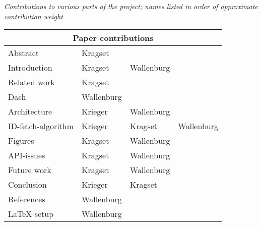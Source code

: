 \begin{appendix}
    \textit{Contributions to various parts of the project; names listed in order
        of approximate contribution weight}

    \resizebox{8cm}{!} {
        \begin{tabular}{| l | l | l | l |}
            \hline
            \multicolumn{4}{|c|}{Paper contributions} \\
            \hline
            Abstract & Kragset & & \\
            Introduction & Kragset & Wallenburg & \\
            Related work & Kragset & & \\
            Dash & Wallenburg & & \\
            Architecture & Krieger & Wallenburg & \\
            ID-fetch-algorithm & Krieger & Kragset & Wallenburg \\
            Figures & Kragset & Wallenburg & \\
            API-issues & Kragset & Wallenburg & \\
            Future work & Kragset & Wallenburg & \\
            Conclusion & Krieger & Kragset & \\
            References & Wallenburg & &\\
            {\LaTeX} setup & Wallenburg & & \\
            \hline
        \end{tabular}
    }


\end{appendix}
